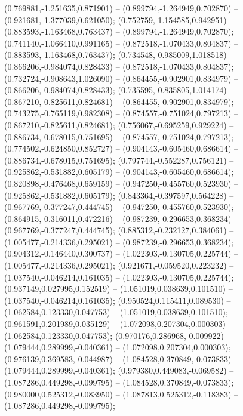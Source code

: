  (0.769881,-1.251635,0.871901) -- (0.899794,-1.264949,0.702870) -- (0.921681,-1.377039,0.621050);
 (0.752759,-1.154585,0.942951) -- (0.883593,-1.163468,0.763437) -- (0.899794,-1.264949,0.702870);
 (0.741140,-1.066410,0.991165) -- (0.872518,-1.070433,0.804837) -- (0.883593,-1.163468,0.763437);
 (0.734548,-0.985009,1.018518) -- (0.866206,-0.984074,0.828433) -- (0.872518,-1.070433,0.804837);
 (0.732724,-0.908643,1.026090) -- (0.864455,-0.902901,0.834979) -- (0.866206,-0.984074,0.828433);
 (0.735595,-0.835805,1.014174) -- (0.867210,-0.825611,0.824681) -- (0.864455,-0.902901,0.834979);
 (0.743275,-0.765119,0.982308) -- (0.874557,-0.751024,0.797213) -- (0.867210,-0.825611,0.824681);
 (0.756067,-0.695259,0.929224) -- (0.886734,-0.678015,0.751695) -- (0.874557,-0.751024,0.797213);
 (0.774502,-0.624850,0.852727) -- (0.904143,-0.605460,0.686614) -- (0.886734,-0.678015,0.751695);
 (0.797744,-0.552287,0.756121) -- (0.925862,-0.531882,0.605179) -- (0.904143,-0.605460,0.686614);
 (0.820898,-0.476468,0.659159) -- (0.947250,-0.455760,0.523930) -- (0.925862,-0.531882,0.605179);
 (0.843364,-0.397597,0.564228) -- (0.967769,-0.377247,0.444745) -- (0.947250,-0.455760,0.523930);
 (0.864915,-0.316011,0.472216) -- (0.987239,-0.296653,0.368234) -- (0.967769,-0.377247,0.444745);
 (0.885312,-0.232127,0.384061) -- (1.005477,-0.214336,0.295021) -- (0.987239,-0.296653,0.368234);
 (0.904312,-0.146440,0.300737) -- (1.022303,-0.130705,0.225744) -- (1.005477,-0.214336,0.295021);
 (0.921671,-0.059520,0.223232) -- (1.037540,-0.046214,0.161035) -- (1.022303,-0.130705,0.225744);
 (0.937149,0.027995,0.152519) -- (1.051019,0.038639,0.101510) -- (1.037540,-0.046214,0.161035);
 (0.950524,0.115411,0.089530) -- (1.062584,0.123330,0.047753) -- (1.051019,0.038639,0.101510);
 (0.961591,0.201989,0.035129) -- (1.072098,0.207304,0.000303) -- (1.062584,0.123330,0.047753);
 (0.970176,0.286968,-0.009922) -- (1.079444,0.289999,-0.040361) -- (1.072098,0.207304,0.000303);
 (0.976139,0.369583,-0.044987) -- (1.084528,0.370849,-0.073833) -- (1.079444,0.289999,-0.040361);
 (0.979380,0.449083,-0.069582) -- (1.087286,0.449298,-0.099795) -- (1.084528,0.370849,-0.073833);
 (0.980000,0.525312,-0.083950) -- (1.087813,0.525312,-0.118383) -- (1.087286,0.449298,-0.099795);
